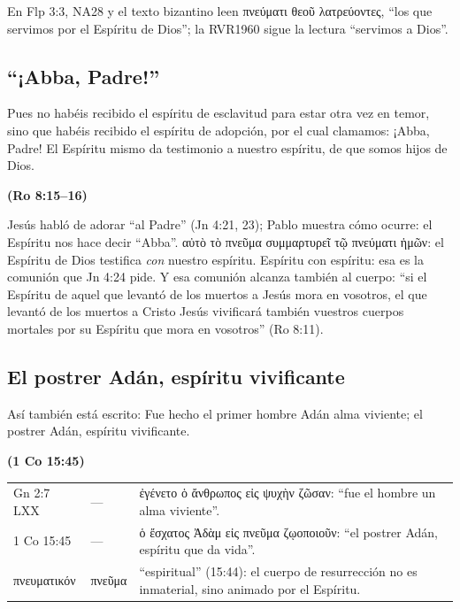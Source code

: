 \documentclass[11pt,letterpaper]{article}
\newcommand{\grc}[1]{\foreignlanguage{ancientgreek}{#1}}
\newcommand{\fuente}[1]{\par\hfill{\upshape\bfseries\small\textcolor{azul}{#1}}}
\begin{document}
\begin{nota}
En Flp 3:3, NA28 y el texto bizantino leen \grc{πνεύματι θεοῦ λατρεύοντες}, ``los que servimos por el Espíritu de Dios''; la RVR1960 sigue la lectura ``servimos a Dios''.
\end{nota}

\subsection{``¡Abba, Padre!''}

\begin{cita}Pues no habéis recibido el espíritu de esclavitud para estar otra vez en temor, sino que habéis recibido el espíritu de adopción, por el cual clamamos: ¡Abba, Padre! El Espíritu mismo da testimonio a nuestro espíritu, de que somos hijos de Dios.\fuente{(Ro 8:15--16)}\end{cita}

Jesús habló de adorar ``al Padre'' (Jn 4:21, 23); Pablo muestra cómo ocurre: el Espíritu nos hace decir ``Abba''. \grc{αὐτὸ τὸ πνεῦμα συμμαρτυρεῖ τῷ πνεύματι ἡμῶν}: el Espíritu de Dios testifica \emph{con} nuestro espíritu. Espíritu con espíritu: esa es la comunión que Jn 4:24 pide. Y esa comunión alcanza también al cuerpo: ``si el Espíritu de aquel que levantó de los muertos a Jesús mora en vosotros, el que levantó de los muertos a Cristo Jesús vivificará también vuestros cuerpos mortales por su Espíritu que mora en vosotros'' (Ro 8:11).

\subsection{El postrer Adán, espíritu vivificante}

\begin{cita}Así también está escrito: Fue hecho el primer hombre Adán alma viviente; el postrer Adán, espíritu vivificante.\fuente{(1 Co 15:45)}\end{cita}

\begin{filologia}[1 Co 15:45 y Gn 2:7]
\begin{tabular}{@{}L{2.6cm}L{1.6cm}L{10.6cm}@{}}
Gn 2:7 LXX & --- & \grc{ἐγένετο ὁ ἄνθρωπος εἰς ψυχὴν ζῶσαν}: ``fue el hombre un alma viviente''. \\[2pt]
1 Co 15:45 & --- & \grc{ὁ ἔσχατος Ἀδὰμ εἰς πνεῦμα ζῳοποιοῦν}: ``el postrer Adán, espíritu que da vida''. \\[2pt]
\grc{πνευματικόν} & \grc{πνεῦμα} & ``espiritual'' (15:44): el cuerpo de resurrección no es inmaterial, sino animado por el Espíritu. \\
\end{tabular}
\end{filologia}
\end{document}
